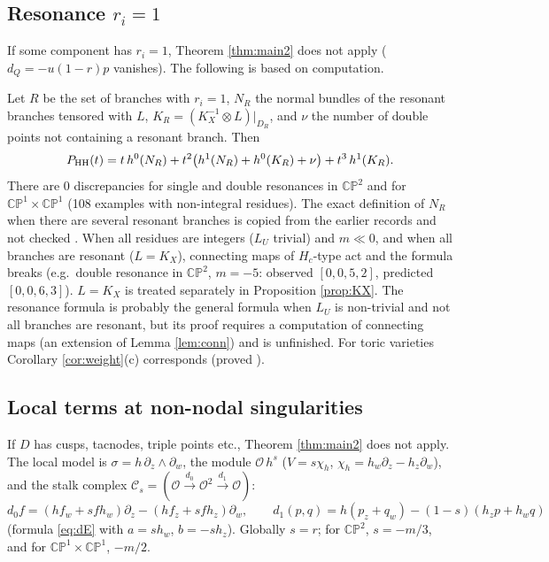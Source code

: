 \subsection{Resonance $r_i=1$}
If some component has $r_i=1$, Theorem \ref{thm:main2} does not apply ($d_Q=-u(1-r)p$ vanishes). The following is based on computation.
\begin{obs}\label{obs:res}
Let $R$ be the set of branches with $r_i=1$, $N_R$ the normal bundles of the resonant branches tensored with $L$, $K_R=(K_X^{-1}\otimes L)|_{D_R}$, and $\nu$ the number of double points not containing a resonant branch. Then
\[P_{\mathrm{HH}}(t)=t\,h^0(N_R)+t^2\bigl(h^1(N_R)+h^0(K_R)+\nu\bigr)+t^3\,h^1(K_R).\]
There are 0 discrepancies for single and double resonances in $\mathbb{CP}^2$ and for $\mathbb{CP}^1\times\mathbb{CP}^1$ (108 examples with non-integral residues). The exact definition of $N_R$ when there are several resonant branches is copied from the earlier records and not checked \tQ. When all residues are integers ($L_U$ trivial) and $m\ll0$, and when all branches are resonant ($L=K_X$), connecting maps of $H_c$-type act and the formula breaks (e.g.\ double resonance in $\mathbb{CP}^2$, $m=-5$: observed $[0,0,5,2]$, predicted $[0,0,6,3]$). $L=K_X$ is treated separately in Proposition \ref{prop:KX}. \tK The resonance formula is probably the general formula when $L_U$ is non-trivial and not all branches are resonant, but its proof requires a computation of connecting maps (an extension of Lemma \ref{lem:conn}) and is unfinished. For toric varieties Corollary \ref{cor:weight}(c) corresponds (proved \tP).
\end{obs}

\subsection{Local terms at non-nodal singularities}\label{subsec:local}
If $D$ has cusps, tacnodes, triple points etc., Theorem \ref{thm:main2} does not apply. The local model is $\sigma=h\,\partial_z\wedge\partial_w$, the module $\mathcal O\,h^s$ ($V=s\chi_h$, $\chi_h=h_w\partial_z-h_z\partial_w$), and the stalk complex $\mathcal C_s=(\mathcal O\xrightarrow{d_0}\mathcal O^2\xrightarrow{d_1}\mathcal O)$:
\[d_0f=(hf_w+sfh_w)\partial_z-(hf_z+sfh_z)\partial_w,\qquad d_1(p,q)=h(p_z+q_w)-(1-s)(h_zp+h_wq)\]
(formula \eqref{eq:dE} with $a=sh_w$, $b=-sh_z$). Globally $s=r$; for $\mathbb{CP}^2$, $s=-m/3$, and for $\mathbb{CP}^1\times\mathbb{CP}^1$, $-m/2$.

